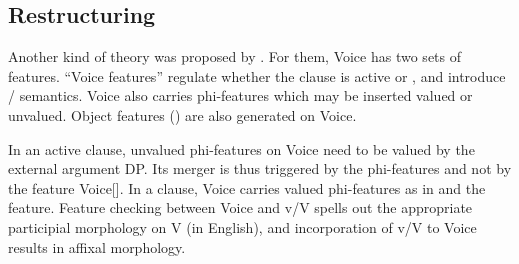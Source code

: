 \begin{exe}
\begin{xlist}
\begin{xlist}
\begin{xlist}
\begin{xlist}
\begin{xlist}
\begin{xlist}
\begin{exe}
\begin{xlist}
\begin{exe}
\begin{exe}
\begin{xlist}
\begin{exe}
\begin{exe}
\begin{xlist}
\begin{exe}
\begin{xlist}
\begin{exe}
\begin{xlist}
\begin{exe}
\begin{xlist}
\begin{exe}
\begin{xlist}
\begin{exe}
\begin{xlist}
\begin{exe}
\begin{xlist}
	\subsection{Restructuring}
Another kind of theory was proposed by \cite{wurmbrandshimamura17}. For them, Voice has two sets of features. ``Voice features'' regulate whether the clause is active or , and introduce / semantics. Voice also carries phi-features which may be inserted valued or unvalued. Object  features () are also generated on Voice.

In an active clause, unvalued phi-features on Voice need to be valued by the external argument DP. Its merger is thus triggered by the phi-features and not by the feature Voice[]. In a  clause, Voice carries valued phi-features as in \cite{legate14} and the  feature. Feature checking between Voice and v/V spells out the appropriate participial morphology on V (in English), and incorporation of v/V to Voice results in affixal morphology.


\end{xlist}
\end{exe}
\end{xlist}
\end{exe}
\end{xlist}
\end{exe}
\end{xlist}
\end{exe}
\end{xlist}
\end{exe}
\end{xlist}
\end{exe}
\end{xlist}
\end{exe}
\end{exe}
\end{xlist}
\end{exe}
\end{exe}
\end{xlist}
\end{exe}
\end{xlist}
\end{xlist}
\end{xlist}
\end{xlist}
\end{xlist}
\end{xlist}
\end{exe}
